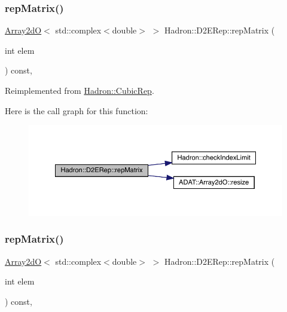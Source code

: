 \subsubsection{\texorpdfstring{repMatrix()}{repMatrix()}\hspace{0.1cm}{\footnotesize\ttfamily [1/2]}}
{\footnotesize\ttfamily \mbox{\hyperlink{classADAT_1_1Array2dO}{Array2dO}}$<$ std\+::complex$<$double$>$ $>$ Hadron\+::\+D2\+E\+Rep\+::rep\+Matrix (\begin{DoxyParamCaption}\item[{int}]{elem }\end{DoxyParamCaption}) const\hspace{0.3cm}{\ttfamily [inline]}, {\ttfamily [virtual]}}



Reimplemented from \mbox{\hyperlink{structHadron_1_1CubicRep_ac5d7e9e6f4ab1158b5fce3e4ad9e8005}{Hadron\+::\+Cubic\+Rep}}.

Here is the call graph for this function\+:
\nopagebreak
\begin{figure}[H]
\begin{center}
\leavevmode
\includegraphics[width=350pt]{d4/d82/structHadron_1_1D2ERep_a0d6937e2a9cf2e22df238b7e3eafbf8e_cgraph}
\end{center}
\end{figure}
\mbox{\label{structHadron_1_1D2ERep_a0d6937e2a9cf2e22df238b7e3eafbf8e}} 
\subsubsection{\texorpdfstring{repMatrix()}{repMatrix()}\hspace{0.1cm}{\footnotesize\ttfamily [2/2]}}
{\footnotesize\ttfamily \mbox{\hyperlink{classADAT_1_1Array2dO}{Array2dO}}$<$ std\+::complex$<$double$>$ $>$ Hadron\+::\+D2\+E\+Rep\+::rep\+Matrix (\begin{DoxyParamCaption}\item[{int}]{elem }\end{DoxyParamCaption}) const\hspace{0.3cm}{\ttfamily [inline]}, {\ttfamily [virtual]}}



